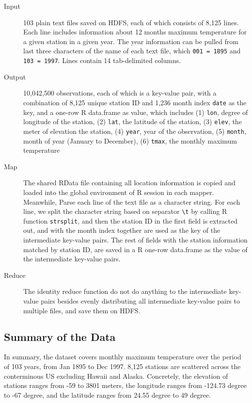 \begin{description}
  \item[Input] 103 plain text files saved on HDFS, each of which consists of 8,125 
  lines. Each line includes information about 12 months maximum temperature for a 
  given station in a given year. The year information can be pulled from last three
  characters of the name of each text file, which \texttt{001 = 1895} and 
  \texttt{103 = 1997}. Lines contain 14 tab-delimited columns.
  \item[Output] 10,042,500 observations, each of which is a key-value pair, with 
  a combination of 8,125 unique station ID and 1,236 month index \texttt{date} as 
  the key, and a one-row R data.frame as value, which includes (1) \texttt{lon}, 
  degree of longitude of the station, (2) \texttt{lat}, the latitude of the station, 
  (3) \texttt{elev}, the meter of elevation the station, (4) \texttt{year}, 
  year of the observation, (5) \texttt{month}, month of year (January to December), 
  (6) \texttt{tmax}, the monthly maximum temperature
  \item[Map] The shared RData file containing all location information is copied 
  and loaded into the global environment of R session in each mapper. Meanwhile,
  Parse each line of the text file as a character string. For each line,
  we split the character string based on separator \texttt{\textbackslash t} by 
  calling R function \texttt{strsplit}, and then the station ID in the first field 
  is extracted out, and with the month index together are used as the key of the 
  intermediate key-value pairs. The rest of fields with the station information
  matched by station ID, are saved in a R one-row data.frame as the value of the
  intermediate key-value pairs. 
  \item[Reduce] The identity reduce function do not do anything to the 
  intermediate key-value pairs besides evenly distributing all intermediate 
  key-value pairs to multiple files, and save them on HDFS.
\end{description}

\subsection{Summary of the Data}
\label{sec:summaryData}

In summary, the dataset covers monthly maximum temperature over the period of 103
years, from Jan 1895 to Dec 1997. 8,125 stations are scattered across the 
conterminous US excluding Hawaii and Alaska. Concretely, the elevation of 
stations ranges from -59 to 3801 meters, the longitude ranges from -124.73 degree
to -67 degree, and the latitude ranges from 24.55 degree to 49 degree. 

